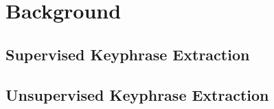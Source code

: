 \section{Background}
\label{sec:background}

  \subsection{Supervised Keyphrase Extraction}
  \label{subsec:supervised_keyphrase_extraction}
     

  \subsection{Unsupervised Keyphrase Extraction}
  \label{subsec:unsupervised_keyphrase_extraction}

